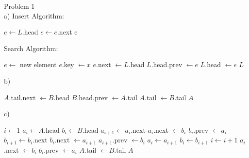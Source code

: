 \documentclass{article}
\begin{document}
Problem 1\\

a)
Insert Algorithm:
\begin{algorithmic}[1]
    \State $e \gets L$.head
        \State $e \gets e$.next
    \EndWhile
    \State \Return e
\EndFunction
\end{algorithmic}

Search Algorithm:
\begin{algorithmic}[1]
        \State $e \gets$ new element
        \State $e$.key $\gets x$
        \State $e$.next $\gets L$.head
        \State $L$.head.prev $\gets e$
        \State $L$.head $\gets e$
        \State \Return $L$
    \EndFunction
\end{algorithmic}

b)
\begin{algorithmic}[1]
        \State $A$.tail.next $\gets B$.head
        \State $B$.head.prev $\gets A$.tail
        \State $A$.tail $\gets B$.tail
        \State \Return $A$
    \EndFunction
\end{algorithmic}

c)
\begin{algorithmic}[1]
        \State $i \gets 1$
        \State $a_i \gets A$.head
        \State $b_i \gets B$.head
            \State $a_{i+1} \gets a_i$.next
            \State $a_i$.next $\gets b_i$
            \State $b_i$.prev $\gets a_i$
            \State $b_{i+1} \gets b_i$.next
            \State $b_i$.next $\gets a_{i+1}$
            \State $a_{i+1}$.prev $\gets b_i$
            \State $a_i \gets a_{i+1}$
            \State $b_i \gets b_{i+1}$
            \State $i \gets i + 1$
        \EndWhile
        \State $a_i$.next $\gets b_i$
        \State $b_i$.prev $\gets a_i$
        \State $A$.tail $\gets B$.tail
        \State \Return $A$
    \EndFunction
\end{algorithmic}
\end{document}
